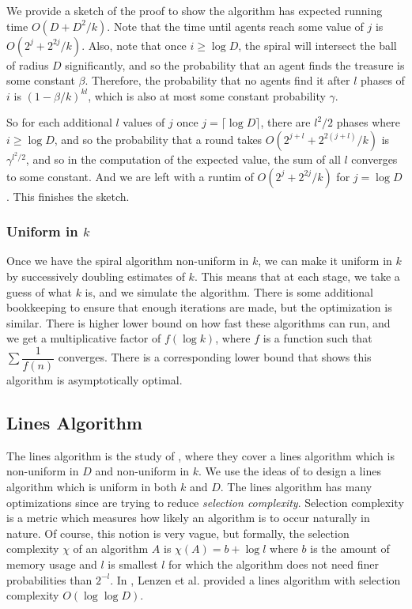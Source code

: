 \documentclass[runningheads,a4paper]{llncs}
\begin{document}
We provide a sketch of the proof to show the algorithm has expected running time $O(D + D^2/k)$. Note that the time until agents reach some value of $j$ is $O(2^j + 2^{2j}/k)$. Also, note that once $i \geq \log D$, the spiral will intersect the ball of radius $D$ significantly, and so the probability that an agent finds the treasure is some constant $\beta$. Therefore, the probability that no agents find it after $l$ phases of $i$ is $(1 - \beta/k)^{kl}$, which is also at most some constant probability $\gamma$.

So for each additional $l$ values of $j$ once $j = \lceil \log D \rceil$, there are $l^2/2$ phases where $i \geq \log D$, and so the probability that a round takes $O(2^{j + l} + 2^{2(j+l)}/k)$ is $\gamma^{l^2/2}$, and so in the computation of the expected value, the sum of all $l$ converges to some constant. And we are left with a runtim of $O(2^{j} + 2^{2j}/k)$ for $j = \log D$. This finishes the sketch.

\subsubsection{Uniform in $k$}

Once we have the spiral algorithm non-uniform in $k$, we can make it uniform in $k$ by successively doubling estimates of $k$. This means that at each stage, we take a guess of what $k$ is, and we simulate the algorithm. There is some additional bookkeeping to ensure that enough iterations are made, but the optimization is similar. There is higher lower bound on how fast these algorithms can run, and we get a multiplicative factor of $f(\log k)$, where $f$ is a function such that $\sum \dfrac{1}{f(n)}$ converges. There is a corresponding lower bound that shows this algorithm is asymptotically optimal.

\subsection{Lines Algorithm}

The lines algorithm is the study of \cite{lenzen2014trade}, where they cover a lines algorithm which is non-uniform in $D$ and non-uniform in $k$. We use the ideas of \cite{feinerman2012collaborative} to design a lines algorithm which is uniform in both $k$ and $D$. The lines algorithm has many optimizations since \cite{lenzen2014trade} are trying to reduce \emph{selection complexity}. Selection complexity is a metric which measures how likely an algorithm is to occur naturally in nature. Of course, this notion is very vague, but formally, the selection complexity $\chi$ of an algorithm $A$ is $\chi(A) = b + \log l$ where $b$ is the amount of memory usage and $l$ is smallest $l$ for which the algorithm does not need finer probabilities than $2^{-l}$. In \cite{lenzen2014trade}, Lenzen et al. provided a lines algorithm with selection complexity $O(\log \log D)$.
\end{document}
